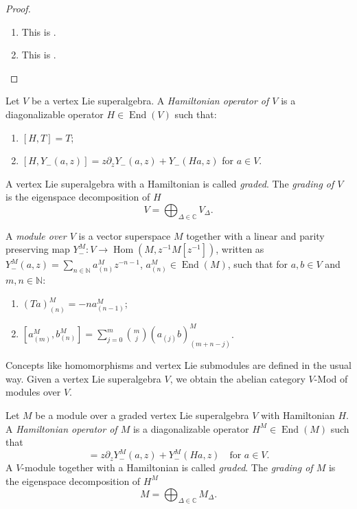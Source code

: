 \documentclass[a4paper, 12pt, reqno]{amsart}
\theoremstyle{remark}
\DeclareMathOperator{\End}{End}
\DeclareMathOperator{\Hom}{Hom}
\begin{document}
\begin{proof}\leavevmode
  \begin{enumerate}
  \item This is .
  \item This is . \qedhere
  \end{enumerate}
\end{proof}

Let $V$ be a vertex Lie superalgebra.
A \emph{Hamiltonian operator of $V$} is a diagonalizable operator $H \in \End(V)$ such that:
\begin{enumerate}
\item $[H, T] = T$;
\item $[H, Y_-(a, z)] = z\partial_zY_-(a, z) + Y_-(Ha, z)$ for $a \in V$.
\end{enumerate}
A vertex Lie superalgebra with a Hamiltonian is called \emph{graded}.
The \emph{grading of $V$} is the eigenspace decomposition of $H$
\begin{equation*}
  V = \bigoplus_{\Delta \in \mathbb{C}}V_{\Delta}.
\end{equation*}

A \emph{module over $V$} is a vector superspace $M$ together with a linear and parity preserving map $Y^M_-: V \to \Hom(M, z^{-1}M[z^{-1}])$, written as $Y^M_-(a, z) = \sum_{n \in \mathbb{N}}a^M_{(n)}z^{-n - 1}$, $a^M_{(n)} \in \End(M)$, such that for $a, b \in V$ and $m, n \in \mathbb{N}$:
\begin{enumerate}
\item $(Ta)^M_{(n)} = -na^M_{(n - 1)}$;
\item $[a^M_{(m)}, b^M_{(n)}] = \sum_{j = 0}^m\binom{m}{j}(a_{(j)}b)^M_{(m + n - j)}$.
\end{enumerate}
Concepts like homomorphisms and vertex Lie submodules are defined in the usual way.
Given a vertex Lie superalgebra $V$, we obtain the abelian category $V$-Mod of modules over $V$.

Let $M$ be a module over a graded vertex Lie superalgebra $V$ with Hamiltonian $H$.
A \emph{Hamiltonian operator of $M$} is a diagonalizable operator $H^M \in \End(M)$ such that
\begin{equation*}
  [H^M, Y^M_-(a, z)] = z\partial_zY^M_-(a, z) + Y^M_-(Ha, z) \quad \text{for $a \in V$}.
\end{equation*}
A $V$-module together with a Hamiltonian is called \emph{graded}.
The \emph{grading of $M$} is the eigenspace decomposition of $H^M$
\begin{equation*}
  M = \bigoplus_{\Delta \in \mathbb{C}}M_{\Delta}.
\end{equation*}
\end{document}
